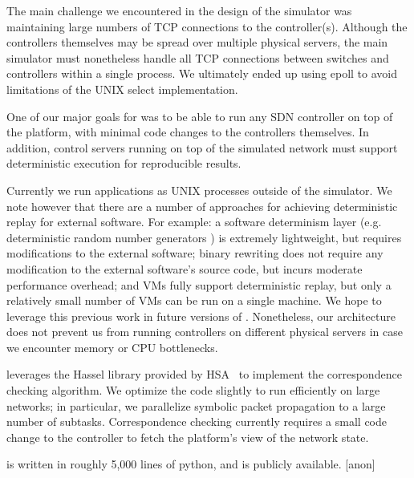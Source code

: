 {The main challenge we encountered in the design of the simulator was
maintaining large numbers of TCP connections to the
controller(s). Although the controllers themselves may be spread
over multiple physical servers, the main simulator must nonetheless handle all
TCP connections between switches and controllers within a single process.
We ultimately ended up using epoll to avoid limitations of the UNIX select
implementation.

 One of our major goals for \projectname{}
was to be able to run any SDN controller on top of the platform, with minimal
code changes to the controllers themselves. In addition, control servers
running on top of the simulated network must support deterministic execution
for reproducible results.

Currently we run applications as UNIX processes outside of the simulator.
We note however that there are a number of approaches for achieving deterministic
replay for external software. For example: a software determinism layer (e.g.
deterministic random number generators ) is
extremely lightweight, but requires modifications to the external software;
binary rewriting does not require any modification to the external
software's source code, but incurs moderate performance overhead; and VMs
fully support deterministic replay, but only a relatively small number of VMs can be run
on a single machine. We hope to leverage this previous work in future versions
of \projectname{}. Nonetheless, our architecture does not prevent us from
running controllers on different physical
servers in case we encounter memory or CPU bottlenecks.

\projectname{} leverages the Hassel library provided by HSA~\cite{hsa}
to implement the correspondence checking algorithm. We optimize the code
slightly to run efficiently on large networks; in particular, we parallelize
symbolic packet propagation to a large number of subtasks. Correspondence
checking currently requires a small code change to the controller to fetch
the platform's view of the network state.

\projectname{} is written in roughly 5,000 lines of python, and is publicly
available. [anon]

}
